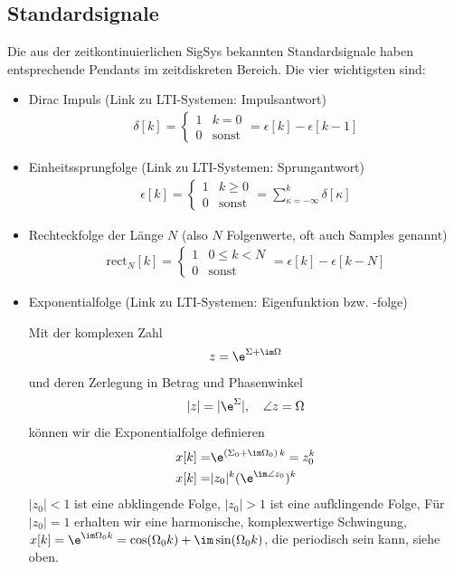 \subsection*{Standardsignale}
Die aus der zeitkontinuierlichen SigSys bekannten Standardsignale haben entsprechende
Pendants im zeitdiskreten Bereich. Die vier wichtigsten sind:
\begin{itemize}
\item Dirac Impuls (Link zu LTI-Systemen: Impulsantwort)
\begin{align}
\delta[k] =
\begin{cases}
1 & k=0\\
0 & \text{sonst}
\end{cases}
=\epsilon[k] - \epsilon[k-1]
\end{align}
\item Einheitssprungfolge (Link zu LTI-Systemen: Sprungantwort)
\begin{align}
\epsilon[k] =
\begin{cases}
1 & k \geq 0\\
0 & \text{sonst}
\end{cases}
=\sum_{\kappa=-\infty}^k \delta[\kappa]
\end{align}
\item Rechteckfolge der Länge $N$ (also $N$ Folgenwerte, oft auch Samples genannt)
\begin{align}
\mathrm{rect}_N[k] =
\begin{cases}
1 & 0 \leq k < N\\
0 & \text{sonst}
\end{cases}
= \epsilon[k] - \epsilon[k-N]
\end{align}
\item Exponentialfolge (Link zu LTI-Systemen: Eigenfunktion bzw. -folge)

\noindent Mit der komplexen Zahl
\begin{align}
z = \e^{\Sigma + \im\Omega}
\end{align}
und deren Zerlegung in Betrag und Phasenwinkel
\begin{align}
|z| = |\e^{\Sigma}|,\quad
\angle z = \Omega
\end{align}
können wir die Exponentialfolge definieren
\begin{align}
x[k] =& \e^{(\Sigma_0 + \im\Omega_0) \, k} = z_0^k\\
x[k] =& |z_0|^k (\e^{\im \angle z_0})^k
\end{align}
$|z_0|<1$ ist eine abklingende Folge, $|z_0|>1$ ist eine aufklingende Folge,
Für $|z_0|=1$ erhalten wir eine harmonische, komplexwertige Schwingung,
$x[k] = \e^{\im \Omega_0 k} = \cos(\Omega_0 k) + \im \sin(\Omega_0 k)$,
die periodisch sein kann, siehe oben.
\end{itemize}
